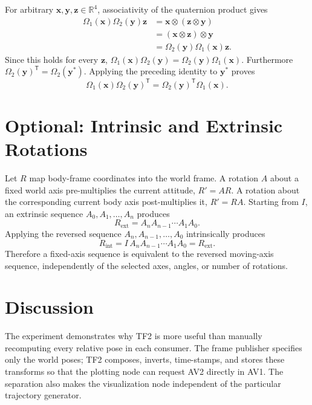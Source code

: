 \documentclass[11pt,a4paper]{article}
\newcommand{\vect}[1]{\bm{#1}}
\newcommand{\R}{\mathbb{R}}
\begin{document}
For arbitrary $\vect{x},\vect{y},\vect{z}\in\R^4$, associativity of the quaternion product gives
\begin{align}
\Omega_1(\vect{x})\Omega_2(\vect{y})\vect{z}
&=\vect{x}\otimes(\vect{z}\otimes\vect{y})\\
&=(\vect{x}\otimes\vect{z})\otimes\vect{y}\\
&=\Omega_2(\vect{y})\Omega_1(\vect{x})\vect{z}.
\end{align}
Since this holds for every $\vect{z}$,
$\Omega_1(\vect{x})\Omega_2(\vect{y})
=\Omega_2(\vect{y})\Omega_1(\vect{x})$.
Furthermore $\Omega_2(\vect{y})^{\mathsf T}=\Omega_2(\vect{y}^{*})$. Applying the preceding identity to $\vect{y}^{*}$ proves
\begin{equation}
\Omega_1(\vect{x})\Omega_2(\vect{y})^{\mathsf T}
=\Omega_2(\vect{y})^{\mathsf T}\Omega_1(\vect{x}).
\end{equation}

\section{Optional: Intrinsic and Extrinsic Rotations}

Let $R$ map body-frame coordinates into the world frame. A rotation $A$ about a fixed world axis pre-multiplies the current attitude, $R' = AR$. A rotation about the corresponding current body axis post-multiplies it, $R'=RA$. Starting from $I$, an extrinsic sequence $A_0,A_1,\ldots,A_n$ produces
\begin{equation}
R_{\mathrm{ext}}=A_nA_{n-1}\cdots A_1A_0.
\end{equation}
Applying the reversed sequence $A_n,A_{n-1},\ldots,A_0$ intrinsically produces
\begin{equation}
R_{\mathrm{int}}=I\,A_nA_{n-1}\cdots A_1A_0
=R_{\mathrm{ext}}.
\end{equation}
Therefore a fixed-axis sequence is equivalent to the reversed moving-axis sequence, independently of the selected axes, angles, or number of rotations.

\section{Discussion}

The experiment demonstrates why TF2 is more useful than manually recomputing every relative pose in each consumer. The frame publisher specifies only the world poses; TF2 composes, inverts, time-stamps, and stores these transforms so that the plotting node can request AV2 directly in AV1. The separation also makes the visualization node independent of the particular trajectory generator.
\end{document}
